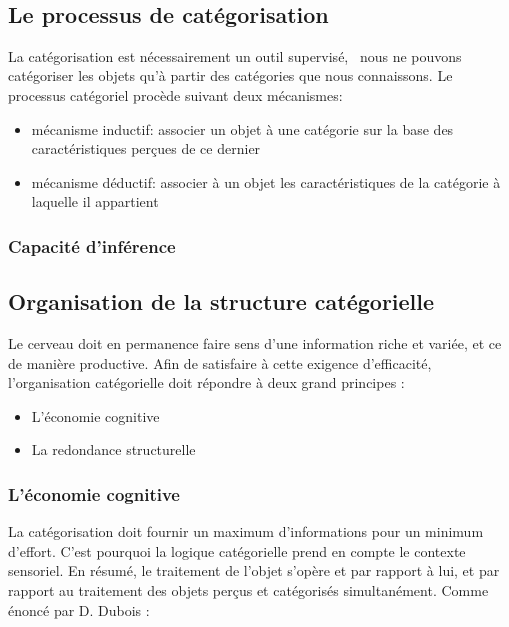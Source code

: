  \\

\subsection{Le processus de catégorisation}

La catégorisation est nécessairement un outil supervisé, \ie~nous ne pouvons catégoriser les objets qu'à partir des catégories que nous connaissons. Le processus catégoriel procède suivant deux mécanismes:
\begin{itemize}
\item mécanisme inductif: associer un objet à une catégorie sur la base des caractéristiques perçues de ce dernier
\item mécanisme déductif: associer à un objet les caractéristiques de la catégorie à laquelle il appartient
\end{itemize}

\subsubsection{Capacité d'inférence}

\subsection{Organisation de la structure catégorielle}

Le cerveau doit en permanence faire sens d'une information riche et variée, et ce de manière productive. Afin de satisfaire à cette exigence d'efficacité, l'organisation catégorielle doit répondre à deux grand principes \citep[p. 29]{rosch1978cognition}:

\begin{itemize}
\item L'économie cognitive
\item La redondance structurelle
\end{itemize}

\subsubsection{L'économie cognitive}

La catégorisation doit fournir un maximum d'informations pour un minimum d'effort. C'est pourquoi la logique catégorielle prend en compte le contexte sensoriel. En résumé, le traitement de l'objet s'opère et par rapport à lui, et par rapport au traitement des objets perçus et catégorisés simultanément. Comme énoncé par D. Dubois \citep[p. 33]{dubois1991semantique}:

